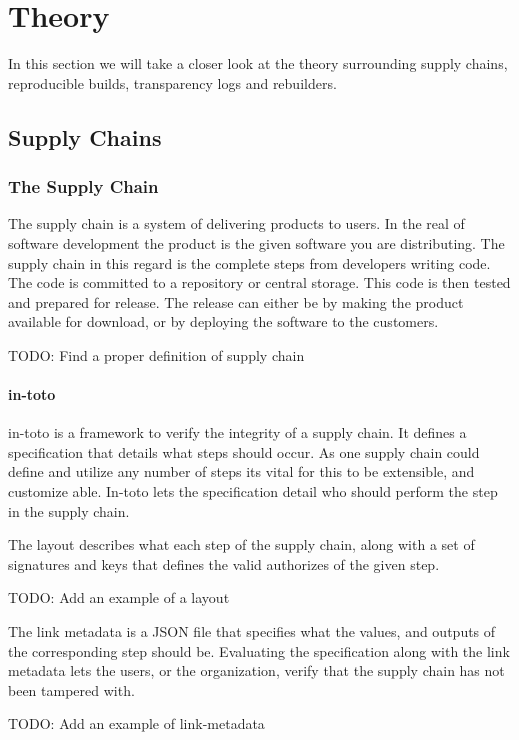 \documentclass[../Main/thesis.tex]{subfiles}
\begin{document}
\chapter{Theory}
\label{ch:theory}
In this section we will take a closer look at the theory surrounding
supply chains, reproducible builds, transparency logs and rebuilders.

\section{Supply Chains}\label{sec:supply_chain}
    \subsection*{The Supply Chain}
    The supply chain is a system of delivering products to users. In the real of
    software development the product is the given software you are distributing.
    The supply chain in this regard is the complete steps from developers
    writing code. The code is committed to a repository or central storage. This
    code is then tested and prepared for release. The release can either be by
    making the product available for download, or by deploying the software to
    the customers.

    TODO: Find a proper definition of supply chain

    \subsubsection*{in-toto}
    in-toto is a framework to verify the integrity of a supply chain. It defines
    a specification that details what steps should occur. As one supply chain
    could define and utilize any number of steps its vital for this to be
    extensible, and customize able. In-toto lets the specification detail who
    should perform the step in the supply chain.
  
    The layout describes what each step of the supply chain, along with a set of
    signatures and keys that defines the valid authorizes of the given step.

    TODO: Add an example of a layout

    The link metadata is a JSON file that specifies what the values, and outputs
    of the corresponding step should be. Evaluating the specification along with
    the link metadata lets the users, or the organization, verify that the
    supply chain has not been tampered with. 

    TODO: Add an example of link-metadata
\end{document}
